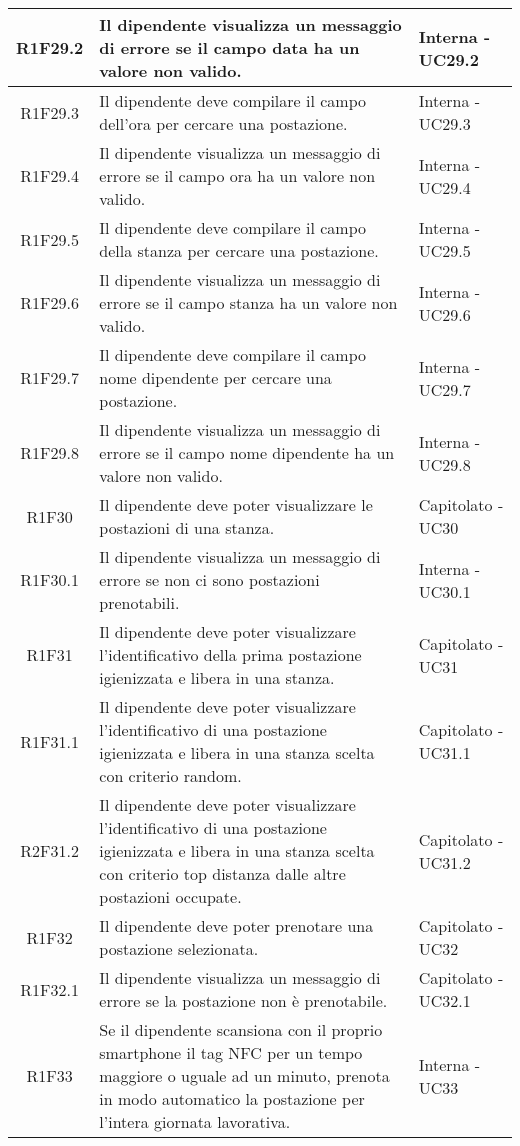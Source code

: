 \begin{center}
\begin{longtable}{|c|p{10cm}|p{4cm}|}
		\hline
			R1F29.2&Il dipendente visualizza un messaggio di errore se il campo data ha un valore non valido.	&Interna - UC29.2	\\
		\hline
			R1F29.3&Il dipendente deve compilare il campo dell'ora per cercare una postazione.	&Interna - UC29.3	\\
		\hline
			R1F29.4&Il dipendente visualizza un messaggio di errore se il campo ora ha un valore non valido.	&Interna - UC29.4	\\
		\hline
			R1F29.5&Il dipendente deve compilare il campo della stanza per cercare una postazione.		&Interna - UC29.5	\\
		\hline
			R1F29.6&Il dipendente visualizza un messaggio di errore se il campo stanza ha un valore non valido.	&Interna - UC29.6	\\
		\hline
			R1F29.7&Il dipendente deve compilare il campo nome dipendente per cercare una postazione.	&Interna - UC29.7	\\
		\hline
			R1F29.8&Il dipendente visualizza un messaggio di errore se il campo nome dipendente ha un valore non valido.	&Interna - UC29.8	\\
		\hline
		R1F30&Il dipendente deve poter visualizzare le postazioni di una stanza.	&Capitolato - UC30	\\
		\hline
			R1F30.1&Il dipendente visualizza un messaggio di errore se non ci sono postazioni prenotabili.	&Interna - UC30.1	\\
		\hline
		R1F31&Il dipendente deve poter visualizzare l'identificativo della prima postazione igienizzata e libera in una stanza.	&Capitolato - UC31	\\
		\hline
		R1F31.1&Il dipendente deve poter visualizzare l'identificativo di una postazione igienizzata e libera in una stanza scelta con criterio random.	&Capitolato - UC31.1	\\
		\hline
		R2F31.2&Il dipendente deve poter visualizzare l'identificativo di una postazione igienizzata e libera in una stanza scelta con criterio top distanza dalle altre postazioni occupate.	&Capitolato - UC31.2	\\
		\hline
		R1F32&Il dipendente deve poter prenotare una postazione selezionata.	&Capitolato - UC32	\\
		\hline
		R1F32.1&Il dipendente visualizza un messaggio di errore se la postazione non è prenotabile.	&Capitolato - UC32.1	\\
		\hline
		R1F33&Se il dipendente scansiona con il proprio smartphone il tag NFC per un tempo maggiore o uguale ad un minuto, prenota in modo automatico la postazione per l’intera giornata lavorativa. &Interna - UC33	\\

\end{longtable}
\end{center}
